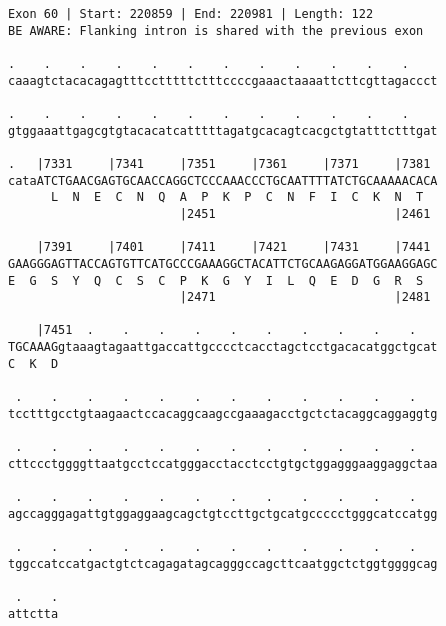 \documentclass{article}
\begin{document}
\begin{Verbatim}
Exon 60 | Start: 220859 | End: 220981 | Length: 122
BE AWARE: Flanking intron is shared with the previous exon
 
.    .    .    .    .    .    .    .    .    .    .    .    
caaagtctacacagagtttcctttttctttccccgaaactaaaattcttcgttagaccct
  
.    .    .    .    .    .    .    .    .    .    .    .    
gtggaaattgagcgtgtacacatcatttttagatgcacagtcacgctgtatttctttgat
  
.   |7331     |7341     |7351     |7361     |7371     |7381 
cataATCTGAACGAGTGCAACCAGGCTCCCAAACCCTGCAATTTTATCTGCAAAAACACA
      L  N  E  C  N  Q  A  P  K  P  C  N  F  I  C  K  N  T  
                        |2451                         |2461 
  
    |7391     |7401     |7411     |7421     |7431     |7441 
GAAGGGAGTTACCAGTGTTCATGCCCGAAAGGCTACATTCTGCAAGAGGATGGAAGGAGC
E  G  S  Y  Q  C  S  C  P  K  G  Y  I  L  Q  E  D  G  R  S  
                        |2471                         |2481 
  
    |7451  .    .    .    .    .    .    .    .    .    .   
TGCAAAGgtaaagtagaattgaccattgcccctcacctagctcctgacacatggctgcat
C  K  D                                                     
  
 .    .    .    .    .    .    .    .    .    .    .    .   
tcctttgcctgtaagaactccacaggcaagccgaaagacctgctctacaggcaggaggtg
  
 .    .    .    .    .    .    .    .    .    .    .    .   
cttccctggggttaatgcctccatgggacctacctcctgtgctggagggaaggaggctaa
  
 .    .    .    .    .    .    .    .    .    .    .    .   
agccagggagattgtggaggaagcagctgtccttgctgcatgccccctgggcatccatgg
  
 .    .    .    .    .    .    .    .    .    .    .    .   
tggccatccatgactgtctcagagatagcagggccagcttcaatggctctggtggggcag
  
 .    .
attctta
\end{Verbatim}
\newpage
\end{document}
